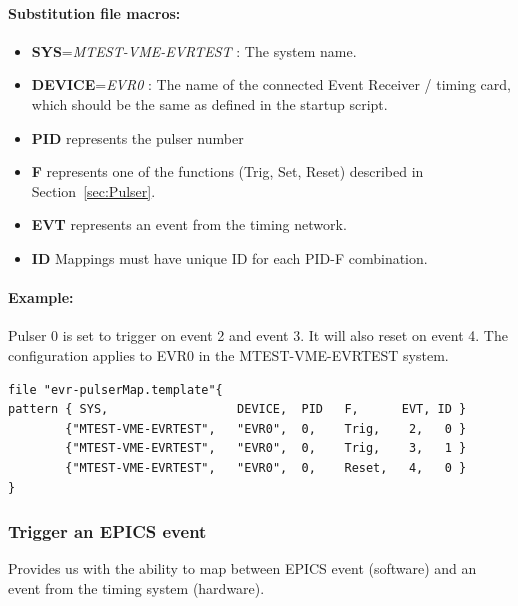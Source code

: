 \documentclass[12pt,a4paper]{article}
\begin{document}
\paragraph{Substitution file macros:}
\begin{itemize}
\item
	\textbf{SYS}=\emph{MTEST-VME-EVRTEST} : The system name. 
\item
	\textbf{DEVICE}=\emph{EVR0} : The name of the connected Event Receiver / timing card, which should be the same as defined in the startup script.
\item
  \textbf{PID} represents the pulser number
\item
  \textbf{F} represents one of the functions (Trig, Set, Reset) described in Section~\ref{sec:Pulser}.
\item
  \textbf{EVT} represents an event from the timing network.
\item
  \textbf{ID} Mappings must have unique ID for each PID-F combination.
\end{itemize}

\paragraph{Example:} Pulser 0 is set to trigger on event 2 and event 3. It will also
reset on event 4. The configuration applies to EVR0 in the MTEST-VME-EVRTEST system.

\begin{verbatim}
file "evr-pulserMap.template"{
pattern { SYS,                  DEVICE,  PID   F,      EVT, ID }
        {"MTEST-VME-EVRTEST",   "EVR0",  0,    Trig,    2,   0 }
        {"MTEST-VME-EVRTEST",   "EVR0",  0,    Trig,    3,   1 }
        {"MTEST-VME-EVRTEST",   "EVR0",  0,    Reset,   4,   0 }
}
\end{verbatim}


\subsubsection{Trigger an EPICS event}\label{evr-softevent.template}
Provides us with the ability to map between EPICS event (software) and an event from the timing system (hardware).
\end{document}
